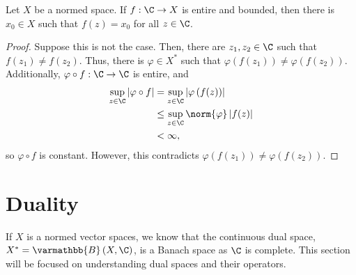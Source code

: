 \documentclass[10pt]{mypackage}
\renewcommand*{\mathbb}[1]{\varmathbb{#1}}
\newcommand{\B}{\mathbb{B}}
\begin{document}
  \begin{corollary}
    Let $X$ be a normed space. If $f: \C\rightarrow X$ is entire and bounded, then there is $x_0\in X$ such that $f(z) = x_0$ for all $z\in \C$.
  \end{corollary}
  \begin{proof}
    Suppose this is not the case. Then, there are $z_1,z_2\in \C$ such that $f\left(z_1\right)\neq f\left(z_2\right)$. Thus, there is $\varphi\in X^{\ast}$ such that $\varphi\left(f\left(z_1\right)\right) \neq \varphi\left(f\left(z_2\right)\right)$. Additionally, $\varphi\circ f: \C\rightarrow \C$ is entire, and
    \begin{align*}
      \sup_{z\in\C}\left\vert \varphi\circ f \right\vert &= \sup_{z\in\C}\left\vert \varphi\left(f(z)\right) \right\vert\\
                                                         &\leq \sup_{z\in \C}\norm{\varphi}\left\vert f(z) \right\vert\\
                                                         &< \infty,
    \end{align*}
    so $\varphi\circ f$ is constant. However, this contradicts $\varphi\left(f\left(z_1\right)\right)\neq \varphi\left(f\left(z_2\right)\right)$.
  \end{proof}
\section{Duality}%
If $X$ is a normed vector spaces, we know that the continuous dual space, $X^{\ast} = \B\left(X,\C\right)$, is a Banach space as $\C$ is complete. This section will be focused on understanding dual spaces and their operators.
\end{document}
